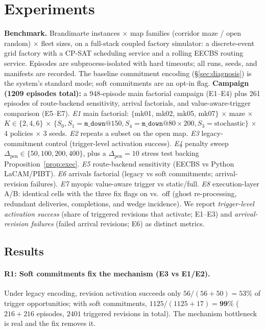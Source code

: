 \documentclass[twocolumn]{article}
\begin{document}
\section{Experiments}
\label{sec:experiments}
\textbf{Benchmark.} Brandimarte instances $\times$ map families
(corridor maze / open random) $\times$ fleet sizes, on a full-stack
coupled factory simulator: a discrete-event grid factory with a CP-SAT
scheduling service and a rolling EECBS routing service. Episodes are
subprocess-isolated with hard timeouts; all runs, seeds, and manifests
are recorded. The baseline commitment encoding (\S\ref{sec:diagnosis})
is the system's standard mode; soft commitments are an opt-in flag.
\textbf{Campaign (1209 episodes total):} a 948-episode main factorial
campaign (E1--E4) plus 261 episodes of route-backend sensitivity,
arrival factorials, and value-aware-trigger comparison (E5--E7).
\emph{E1} main factorial: $\{$mk01, mk02, mk05, mk07$\}$ $\times$ maze
$\times$ $K\in\{2,4,6\}$ $\times$ $\{S_0, S_1{=}\texttt{m\_down}@150,
S_4{=}\texttt{m\_down}@80{\times}200, S_3{=}\text{stochastic}\}$ $\times$
4 policies $\times$ 3 seeds.
\emph{E2} repeats a subset on the open map.
\emph{E3} legacy-commitment control (trigger-level activation success).
\emph{E4} penalty sweep $\Delta_{\mathrm{pen}}\in\{50,100,200,400\}$,
plus a $\Delta_{\mathrm{pen}}{=}10$ stress test backing
Proposition~\ref{prop:exec}.
\emph{E5} route-backend sensitivity (EECBS vs Python LaCAM/PIBT).
\emph{E6} arrivals factorial (legacy vs soft commitments;
arrival-revision failures).
\emph{E7} myopic value-aware trigger vs static/full.
\emph{E8} execution-layer A/B: identical cells with the three fix flags
on vs.\ off (ghost re-processing, redundant deliveries, completions,
and wedge incidence).
We report \emph{trigger-level activation success} (share of triggered
revisions that activate; E1--E3) and \emph{arrival-revision failures}
(failed arrival revisions; E6) as distinct metrics.

\subsection{Results}

\paragraph{R1: Soft commitments fix the mechanism (E3 vs E1/E2).}
Under legacy encoding, revision activation succeeds only
$56/(56{+}50)=53\%$ of trigger opportunities; with soft commitments,
$1125/(1125{+}17)=\mathbf{99\%}$ ($216{+}216$ episodes, $2401$
triggered revisions in total). The mechanism bottleneck is real and the
fix removes it.
\end{document}
